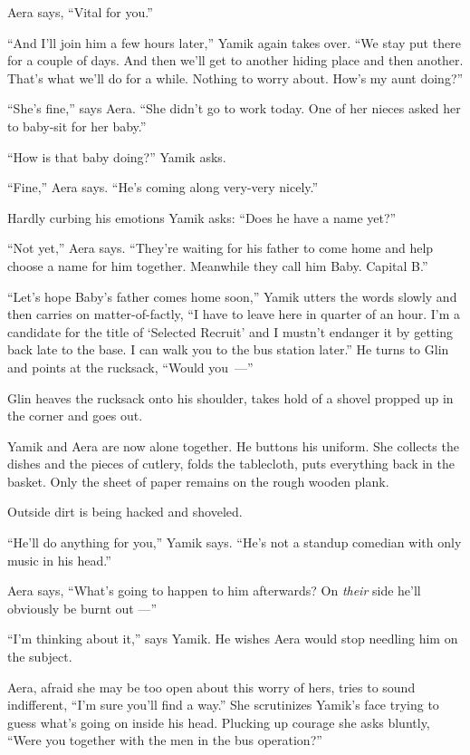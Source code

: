 \documentclass[twoside,11pt,openany]{book}
\begin{document}
Aera says, ``Vital for you.''

``And I'll join him a few hours later,'' Yamik again takes over. ``We stay
put there for a couple of days. And then we'll get to another hiding place and then another. That's what we'll do for a
while. Nothing to worry about. How's my aunt doing?''

``She's fine,'' says Aera. ``She didn't go to work today.  One of her nieces
asked her to baby-sit for her baby.''

``How is that baby doing?'' Yamik asks.

``Fine,'' Aera says.  ``He's coming along very-very nicely.''

Hardly curbing his emotions Yamik asks: ``Does he have a name yet?''

``Not yet,'' Aera says. ``They're waiting for his father to come home and help
choose a name for him together. Meanwhile{ }they call him Baby. Capital
B.''

``Let's hope Baby's father comes home soon,'' Yamik utters the words slowly and
then carries on matter-of-factly, ``I have to leave here in quarter of an hour. I'm a candidate for
the title of `Selected Recruit' and I mustn't endanger it by getting back late to the base. I can walk you to the
bus station later.'' He turns to Glin and points at the rucksack,
``Would you~---''

Glin heaves the rucksack onto his shoulder, takes hold of a shovel{ }propped up
in the corner and goes out.

Yamik and Aera are now alone together. He buttons his uniform. She collects the dishes and the pieces of cutlery, folds
the tablecloth, puts everything back in the basket. Only the sheet of paper remains on the rough wooden plank.

Outside dirt{ }is being hacked and shoveled.

``He'll do anything for you,'' Yamik says. ``He's not a standup comedian
with{ }only music in his head.''

Aera says, ``What's going to happen to him afterwards? On \textit{their} side he'll obviously be burnt out ---''

``I'm thinking about it,'' says Yamik. He wishes
Aera would{ }stop needling him on the subject.

Aera, afraid she may be too open about this worry of hers, tries to sound indifferent, ``I'm sure you'll
find a way.'' She scrutinizes Yamik's face trying to guess what's going on inside his head.  Plucking up
courage she asks bluntly, ``Were you together with the men in the bus operation?''
\end{document}
